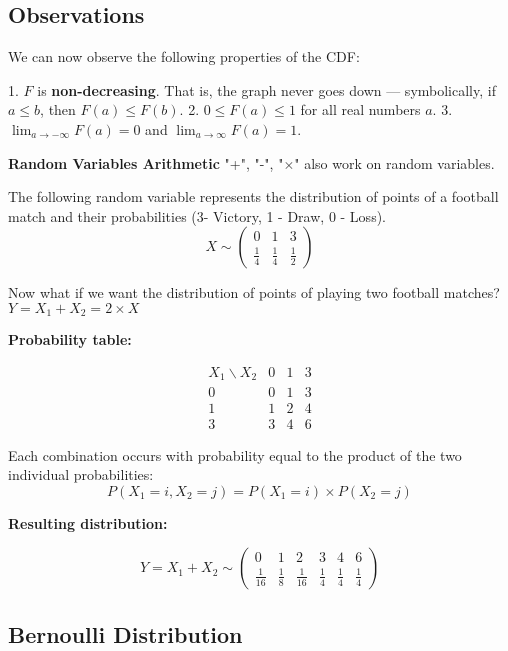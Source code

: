 \documentclass[12pt]{article}
\begin{document}
\subsection*{Observations}

We can now observe the following properties of the CDF:

1. \( F \) is \textbf{non-decreasing}. That is, the graph never goes down — symbolically, if \( a \leq b \), then \( F(a) \leq F(b) \).
2. \( 0 \leq F(a) \leq 1 \) for all real numbers \( a \).
3. \(\displaystyle \lim_{a \to -\infty} F(a) = 0\) and \(\displaystyle \lim_{a \to \infty} F(a) = 1.\)

\textbf{Random Variables Arithmetic}\newline
"+", "-", "$\times$" also work on random variables. \newline

The following random variable represents the distribution of points of a football match and their probabilities (3- Victory, 1 - Draw, 0 - Loss).\newline
\[
X \sim 
\left(
\begin{array}{ccc}
0 & 1 & 3 \\[4pt]
\frac{1}{4} & \frac{1}{4} & \frac{1}{2}
\end{array}
\right)
\]

Now what if we want the distribution of points of playing two football matches?
\(Y = X_1 + X_2 = 2 \times X\)

\textbf{Probability table:}

\[
\begin{array}{c|ccc}
X_1 \backslash X_2 & 0 & 1 & 3 \\ \hline
0 & 0 & 1 & 3 \\
1 & 1 & 2 & 4 \\
3 & 3 & 4 & 6
\end{array}
\]

Each combination occurs with probability equal to the product of the two individual probabilities:
\[
P(X_1=i, X_2=j) = P(X_1=i)\times P(X_2=j)
\]

\textbf{Resulting distribution:}

\[
Y = X_1 + X_2 \sim
\left(
\begin{array}{ccccccc}
0 & 1 & 2 & 3 & 4 & 6 \\[4pt]
\frac{1}{16} & \frac{1}{8} & \frac{1}{16} & \frac{1}{4} & \frac{1}{4} & \frac{1}{4}
\end{array}
\right)
\]

\subsection{Bernoulli Distribution}
\end{document}
